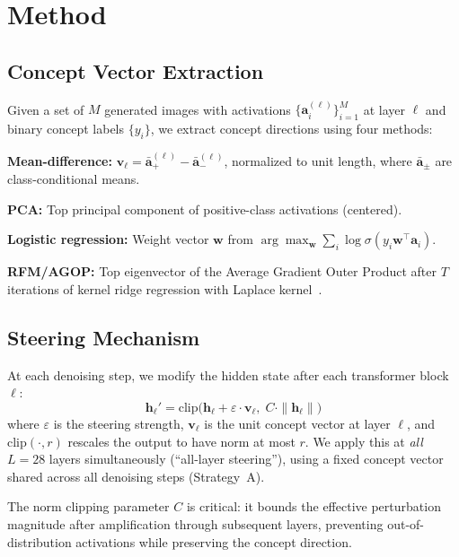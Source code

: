 \documentclass{article}
\theoremstyle{definition}
\newcommand{\ba}{\mathbf{a}}
\newcommand{\bv}{\mathbf{v}}
\newcommand{\bh}{\mathbf{h}}
\begin{document}
\section{Method}
\label{sec:method}

\subsection{Concept Vector Extraction}

Given a set of $M$ generated images with activations $\{\ba_i^{(\ell)}\}_{i=1}^M$ at layer $\ell$ and binary concept labels $\{y_i\}$, we extract concept directions using four methods:

\textbf{Mean-difference:} $\bv_\ell = \bar{\ba}_+^{(\ell)} - \bar{\ba}_-^{(\ell)}$, normalized to unit length, where $\bar{\ba}_\pm$ are class-conditional means.

\textbf{PCA:} Top principal component of positive-class activations (centered).

\textbf{Logistic regression:} Weight vector $\mathbf{w}$ from $\arg\max_\mathbf{w} \sum_i \log \sigma(y_i \mathbf{w}^\top \ba_i)$.

\textbf{RFM/AGOP:} Top eigenvector of the Average Gradient Outer Product after $T$ iterations of kernel ridge regression with Laplace kernel~\citep{radhakrishnan2024mechanism}.

\subsection{Steering Mechanism}

At each denoising step, we modify the hidden state after each transformer block $\ell$:
\begin{equation}
  \bh_\ell' = \text{clip}\big(\bh_\ell + \varepsilon \cdot \bv_\ell,\; C \cdot \|\bh_\ell\|\big)
  \label{eq:steer}
\end{equation}
where $\varepsilon$ is the steering strength, $\bv_\ell$ is the unit concept vector at layer $\ell$, and $\text{clip}(\cdot, r)$ rescales the output to have norm at most $r$.
We apply this at \emph{all} $L = 28$ layers simultaneously (``all-layer steering''), using a fixed concept vector shared across all denoising steps (Strategy~A).

The norm clipping parameter $C$ is critical: it bounds the effective perturbation magnitude after amplification through subsequent layers, preventing out-of-distribution activations while preserving the concept direction.
\end{document}

